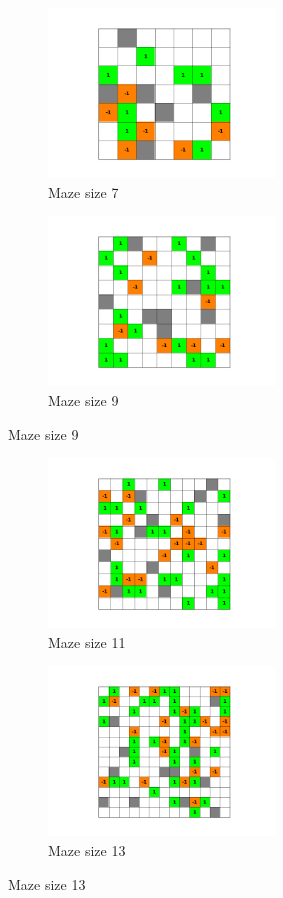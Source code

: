 \documentclass{article}
\begin{document}
\begin{figure}[H]
    \centering
    \begin{subfigure}{.5\textwidth}
        \centering
        \includegraphics[width=60mm]{../results/maze_size_7/env.png}
        \caption{Maze size 7}
        \label{fig:random_env_1}
    \end{subfigure}%
    \begin{subfigure}{.5\textwidth}
        \centering
        \includegraphics[width=60mm]{../results/maze_size_9/env.png}
        \caption{Maze size 9}
        \label{fig:random_env_2}
    \end{subfigure}
\end{figure}
\begin{figure}[H]
    \begin{subfigure}{.5\textwidth}
        \centering
        \includegraphics[width=60mm]{../results/maze_size_11/env.png}
        \caption{Maze size 11}
        \label{fig:random_env_3}
    \end{subfigure}
    \begin{subfigure}{.5\textwidth}
        \centering
        \includegraphics[width=60mm]{../results/maze_size_13/env.png}
        \caption{Maze size 13}
        \label{fig:random_env_4}
    \end{subfigure}
\end{figure}
\end{document}
